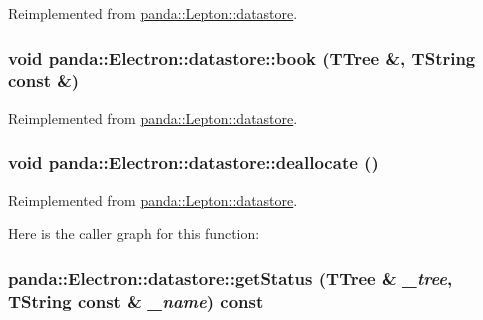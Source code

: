 Reimplemented from \hyperlink{structpanda_1_1Lepton_1_1datastore_a109ac02caed6e0a69a1b00248d80500e}{panda::Lepton::datastore}.\hypertarget{structpanda_1_1Electron_1_1datastore_aa22730e40dda69219e7dac203220dcae}{
\subsubsection[{book}]{\setlength{\rightskip}{0pt plus 5cm}void panda::Electron::datastore::book (TTree \&, \/  TString const \&)}}
\label{structpanda_1_1Electron_1_1datastore_aa22730e40dda69219e7dac203220dcae}


Reimplemented from \hyperlink{structpanda_1_1Lepton_1_1datastore_ab6cf5ada9f43228301c6bd97b9b6238a}{panda::Lepton::datastore}.\hypertarget{structpanda_1_1Electron_1_1datastore_a82e74b804ecc9c1a138d5c3fcd6ef3a3}{
\subsubsection[{deallocate}]{\setlength{\rightskip}{0pt plus 5cm}void panda::Electron::datastore::deallocate ()}}
\label{structpanda_1_1Electron_1_1datastore_a82e74b804ecc9c1a138d5c3fcd6ef3a3}


Reimplemented from \hyperlink{structpanda_1_1Lepton_1_1datastore_a527515ee96020a4aaef41d9de157c131}{panda::Lepton::datastore}.

Here is the caller graph for this function:\hypertarget{structpanda_1_1Electron_1_1datastore_aca8cd939bbe2edf7b152348364b1ac4c}{
\subsubsection[{getStatus}]{ panda::Electron::datastore::getStatus (TTree \& {\em \_\-tree}, \/  TString const \& {\em \_\-name}) const}}
\label{structpanda_1_1Electron_1_1datastore_aca8cd939bbe2edf7b152348364b1ac4c}


